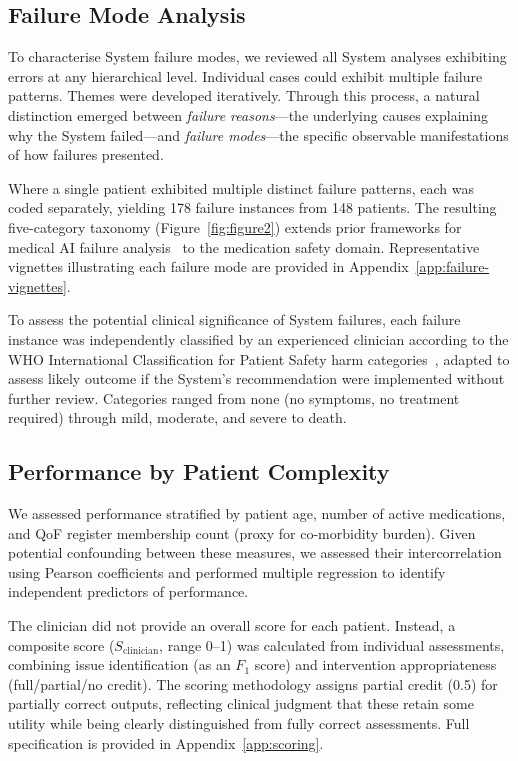 \subsection{Failure Mode Analysis}
    To characterise System failure modes, we reviewed all System analyses exhibiting errors at any hierarchical level. Individual cases could exhibit multiple failure patterns. Themes were developed iteratively. Through this process, a natural distinction emerged between \textit{failure reasons}---the underlying causes explaining why the System failed---and \textit{failure modes}---the specific observable manifestations of how failures presented.

    Where a single patient exhibited multiple distinct failure patterns, each was coded separately, yielding 178 failure instances from 148 patients. The resulting five-category taxonomy (Figure~\ref{fig:figure2}) extends prior frameworks for medical AI failure analysis~\cite{kim2025medicalhallucinationsfoundationmodels, asgari_framework_2025} to the medication safety domain. Representative vignettes illustrating each failure mode are provided in Appendix~\ref{app:failure-vignettes}.

    To assess the potential clinical significance of System failures, each failure instance was independently classified by an experienced clinician according to the WHO International Classification for Patient Safety harm categories~\cite{Cooper2018WHOClassification}, adapted to assess likely outcome if the System's recommendation were implemented without further review. Categories ranged from none (no symptoms, no treatment required) through mild, moderate, and severe to death.


\subsection{Performance by Patient Complexity}
    We assessed performance stratified by patient age, number of active medications, and QoF register membership count (proxy for co-morbidity burden). Given potential confounding between these measures, we assessed their intercorrelation using Pearson coefficients and performed multiple regression to identify independent predictors of performance.

    The clinician did not provide an overall score for each patient. Instead, a composite score ($S_{\text{clinician}}$, range 0--1) was calculated from individual assessments, combining issue identification (as an $F_1$ score) and intervention appropriateness (full/partial/no credit). The scoring methodology assigns partial credit (0.5) for partially correct outputs, reflecting clinical judgment that these retain some utility while being clearly distinguished from fully correct assessments. Full specification is provided in Appendix~\ref{app:scoring}.

